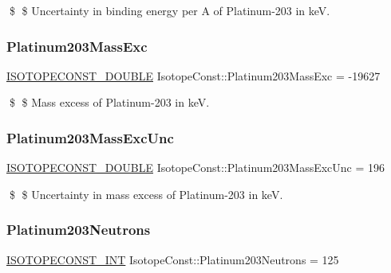 \$ \$ Uncertainty in binding energy per A of Platinum-\/203 in keV. \mbox{\label{group___isotope_const-_platinum-_pt203_gaa9747d086a36bd24b690680613c09dee}} 
\subsubsection{\texorpdfstring{Platinum203\+Mass\+Exc}{Platinum203MassExc}}
{\footnotesize\ttfamily \mbox{\hyperlink{group___isotope_const-_macros_ga8f45a7272ce02c0b4c65c44636ed719a}{I\+S\+O\+T\+O\+P\+E\+C\+O\+N\+S\+T\+\_\+\+D\+O\+U\+B\+LE}} Isotope\+Const\+::\+Platinum203\+Mass\+Exc = -\/19627}

\$ \$ Mass excess of Platinum-\/203 in keV. \mbox{\label{group___isotope_const-_platinum-_pt203_ga6d818baa2f830ab4dfae93fb7eda7ac7}} 
\subsubsection{\texorpdfstring{Platinum203\+Mass\+Exc\+Unc}{Platinum203MassExcUnc}}
{\footnotesize\ttfamily \mbox{\hyperlink{group___isotope_const-_macros_ga8f45a7272ce02c0b4c65c44636ed719a}{I\+S\+O\+T\+O\+P\+E\+C\+O\+N\+S\+T\+\_\+\+D\+O\+U\+B\+LE}} Isotope\+Const\+::\+Platinum203\+Mass\+Exc\+Unc = 196}

\$ \$ Uncertainty in mass excess of Platinum-\/203 in keV. \mbox{\label{group___isotope_const-_platinum-_pt203_ga09b123e07023b512bea3ca1409421c15}} 
\subsubsection{\texorpdfstring{Platinum203\+Neutrons}{Platinum203Neutrons}}
{\footnotesize\ttfamily \mbox{\hyperlink{group___isotope_const-_macros_ga5f18360b3e99483a35c32d789e62621c}{I\+S\+O\+T\+O\+P\+E\+C\+O\+N\+S\+T\+\_\+\+I\+NT}} Isotope\+Const\+::\+Platinum203\+Neutrons = 125}

